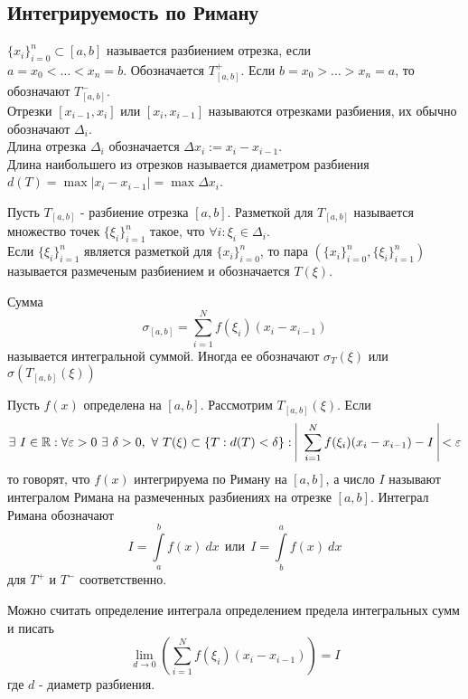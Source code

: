 \subsection{Интегрируемость по Риману}
\begin{definition}
    $\{x_i\}_{i=0}^n\subset [a,b]$ называется разбиением отрезка, если \\
    $a=x_0<\dots<x_n=b$. Обозначается $T_{[a,b]}^+$. Если $b=x_0>\dots>x_n=a$, то обозначают $T_{[a,b]}^-$.\\
    Отрезки $[x_{i-1},x_i]$ или $[x_i, x_{i-1}]$ называются отрезками разбиения, их обычно обозначают $\Delta_i$.\\
    Длина отрезка $\Delta_i$ обозначается $\Delta x_i := x_i-x_{i-1}$. \\
    Длина наибольшего из отрезков называется диаметром разбиения \\
    $d(T)=\max|x_i-x_{i-1}| = \max{\Delta x_i}$. 
\end{definition} 
\begin{definition}
    Пусть $T_{[a,b]}$ - разбиение отрезка $[a,b]$. Разметкой для $T_{[a,b]}$ называется множество точек $\{\xi_i\}_{i=1}^n$ такое, что $\forall i: \xi_i \in \Delta_i$.\\
    Если $\{\xi_i\}_{i=1}^n$ является разметкой для $\{x_i\}_{i=0}^n$, то пара $\left(\{x_i\}_{i=0}^n, \{\xi_i\}_{i=1}^n\right)$ называется размеченым разбиением и обозначается $T(\xi)$.
\end{definition} 
\begin{definition}
    Сумма 
    \[\sigma_{[a,b]}=\sum\limits_{i=1}^{N}f(\xi_i)(x_i-x_{i-1})\]
    называется интегральной суммой. Иногда ее обозначают $\sigma_T(\xi)$ или $\sigma(T_{[a,b]}(\xi))$
\end{definition} 
\begin{definition}
    Пусть $f(x)$ определена на $[a,b]$. Рассмотрим $T_{[a,b]}(\xi)$. Если
    \[\exists\ I\in \R: \forall \epsilon>0\ \exists\ \delta>0,\ \forall\ T(\xi)\subset \{T:d(T)<\delta\}:\ \vline\ \sum\limits_{i=1}^{N}f(\xi_i)(x_i-x_{i-1})-I\ \vline <\epsilon\]
    то говорят, что $f(x)$ интегрируема по Риману на $[a,b]$, а число $I$ называют интегралом Римана на размеченных разбиениях на отрезке $[a,b]$. Интеграл Римана обозначают
    \[I=\int\limits_{a}^{b}f(x)\ dx\ \ \text{или}\ \ I=\int\limits_{b}^{a}f(x)\ dx\]
    для $T^+$ и $T^-$ соответственно. 
\end{definition} 
\begin{comm}
    Можно считать определение интеграла определением предела интегральных сумм и писать
    \[\lim\limits_{d\to 0}\left(\sum\limits_{i=1}^{N}f(\xi_i)(x_i-x_{i-1})\right)=I\]
    где $d$ - диаметр разбиения.
\end{comm} 
